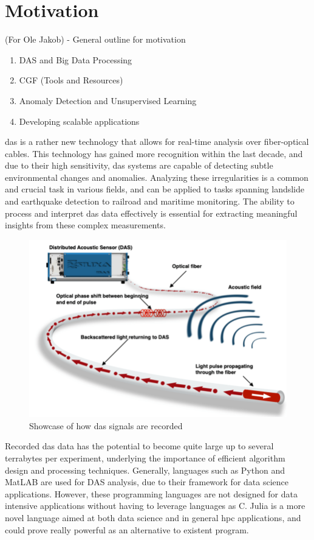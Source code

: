\section{Motivation}

(For Ole Jakob) - General outline for motivation
\begin{enumerate}
    \item DAS and Big Data Processing
    \item CGF (Tools and Resources)
    \item Anomaly Detection and Unsupervised Learning
    \item Developing scalable applications
\end{enumerate}

\acrfull{das} is a rather new technology that allows for real-time analysis over fiber-optical cables. This technology has gained more recognition within the last decade, and due to their high sensitivity, \acrshort{das} systems are capable of detecting subtle environmental changes and anomalies. Analyzing these irregularities is a common and crucial task in various fields, and can be applied to tasks spanning landslide and earthquake detection to railroad and maritime monitoring. The ability to process and interpret \acrshort{das} data effectively is essential for extracting meaningful insights from these complex measurements. \\

\begin{figure}[!h]
    \centering
    \includegraphics[width=0.7\linewidth]{figures/das.png}
    \caption{Showcase of how \acrshort{das} signals are recorded}
    \label{fig:das-fig}
\end{figure}


Recorded \acrshort{das} data has the potential to become quite large up to several terrabytes per experiment, underlying the importance of efficient algorithm design and processing techniques. Generally, languages such as Python and MatLAB are used for DAS analysis, due to their framework for data science applications. However, these programming languages are not designed for data intensive applications without having to leverage languages as C. Julia is a more novel language aimed at both data science and in general \acrfull{hpc} applications, and could prove really powerful as an alternative to existent program.


